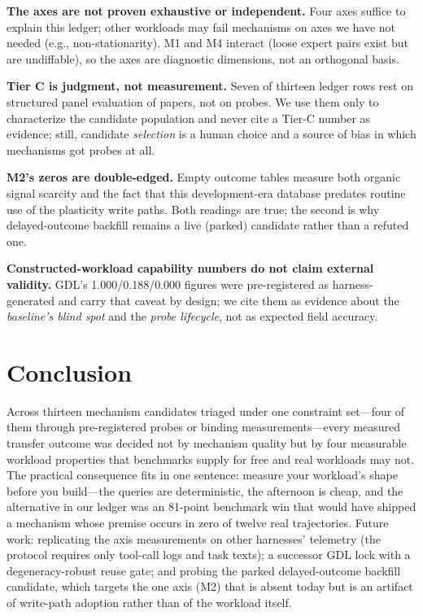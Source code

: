 \documentclass[11pt]{article}
\begin{document}
\textbf{The axes are not proven exhaustive or independent.} Four axes suffice to explain this ledger; other workloads may fail mechanisms on axes we have not needed (e.g., non-stationarity). M1 and M4 interact (loose expert pairs exist but are undiffable), so the axes are diagnostic dimensions, not an orthogonal basis.

\textbf{Tier C is judgment, not measurement.} Seven of thirteen ledger rows rest on structured panel evaluation of papers, not on probes. We use them only to characterize the candidate population and never cite a Tier-C number as evidence; still, candidate \emph{selection} is a human choice and a source of bias in which mechanisms got probes at all.

\textbf{M2's zeros are double-edged.} Empty outcome tables measure both organic signal scarcity and the fact that this development-era database predates routine use of the plasticity write paths. Both readings are true; the second is why delayed-outcome backfill remains a live (parked) candidate rather than a refuted one.

\textbf{Constructed-workload capability numbers do not claim external validity.} GDL's 1.000/0.188/0.000 figures were pre-registered as harness-generated and carry that caveat by design; we cite them as evidence about the \emph{baseline's blind spot} and the \emph{probe lifecycle}, not as expected field accuracy.

\section{Conclusion}

Across thirteen mechanism candidates triaged under one constraint set---four of them through pre-registered probes or binding measurements---every measured transfer outcome was decided not by mechanism quality but by four measurable workload properties that benchmarks supply for free and real workloads may not. The practical consequence fits in one sentence: measure your workload's shape before you build---the queries are deterministic, the afternoon is cheap, and the alternative in our ledger was an 81-point benchmark win that would have shipped a mechanism whose premise occurs in zero of twelve real trajectories. Future work: replicating the axis measurements on other harnesses' telemetry (the protocol requires only tool-call logs and task texts); a successor GDL lock with a degeneracy-robust reuse gate; and probing the parked delayed-outcome backfill candidate, which targets the one axis (M2) that is absent today but is an artifact of write-path adoption rather than of the workload itself.
\end{document}
